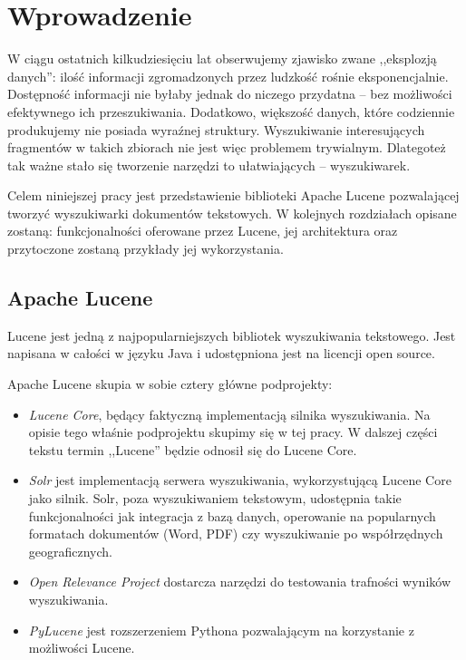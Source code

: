 \chapter{Wprowadzenie}

W ciągu ostatnich kilkudziesięciu lat obserwujemy zjawisko zwane ,,eksplozją danych'': ilość informacji zgromadzonych przez ludzkość rośnie eksponencjalnie. Dostępność informacji nie byłaby jednak do niczego przydatna -- bez możliwości efektywnego ich przeszukiwania. Dodatkowo, większość danych, które codziennie produkujemy nie posiada wyraźnej struktury.  Wyszukiwanie interesujących fragmentów w takich zbiorach nie jest więc problemem trywialnym. Dlategoteż tak ważne stało się tworzenie narzędzi to ułatwiających -- wyszukiwarek. 

Celem niniejszej pracy jest przedstawienie biblioteki Apache Lucene pozwalającej tworzyć wyszukiwarki dokumentów tekstowych. W kolejnych rozdziałach opisane zostaną: funkcjonalności oferowane przez Lucene, jej architektura oraz przytoczone zostaną przykłady jej wykorzystania.

\section{Apache Lucene}

Lucene jest jedną z najpopularniejszych bibliotek wyszukiwania tekstowego. Jest napisana w całości w języku Java i udostępniona jest na licencji open source.

Apache Lucene skupia w sobie cztery główne podprojekty: 
\begin{itemize}
 \item \emph{Lucene Core}, będący faktyczną implementacją silnika wyszukiwania. Na opisie tego właśnie podprojektu skupimy się w tej pracy. W dalszej części tekstu termin ,,Lucene'' będzie odnosił się do Lucene Core.
 \item \emph{Solr} jest implementacją serwera wyszukiwania, wykorzystującą Lucene Core jako silnik. Solr, poza wyszukiwaniem tekstowym, udostępnia takie funkcjonalności jak integracja z bazą danych, operowanie na popularnych formatach dokumentów (Word, PDF) czy wyszukiwanie po współrzędnych geograficznych.
 \item \emph{Open Relevance Project} dostarcza narzędzi do testowania trafności wyników wyszukiwania.
 \item \emph{PyLucene} jest rozszerzeniem Pythona pozwalającym na korzystanie z możliwości Lucene.
\end{itemize}

